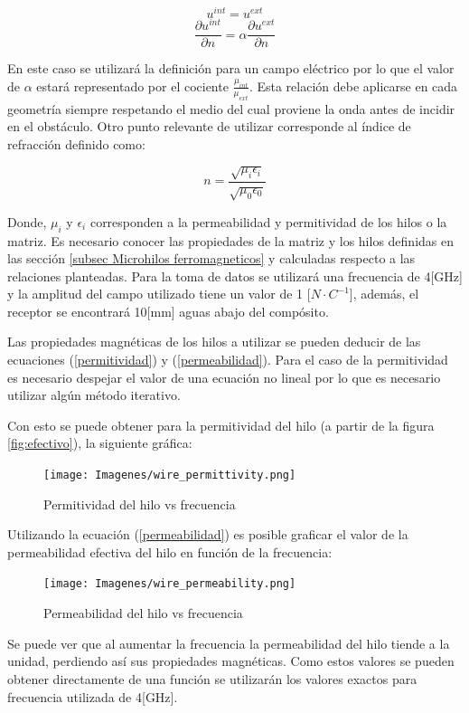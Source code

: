 \documentclass[12pt,letterpaper]{article}
\numberwithin{equation}{section}
\begin{document}
$$u^{int} = u^{ext}$$
$$\frac{\partial u^{int}}{\partial n} =\alpha \frac{\partial u^{ext}}{\partial n}$$
	
En este caso se utilizará la definición para un campo eléctrico por lo que el valor de $\alpha$ estará representado por el cociente $\frac{\mu_{int}}{\mu_{ext}}$. Esta relación debe aplicarse en cada geometría siempre respetando el medio del cual proviene la onda antes de incidir en el obstáculo. Otro punto relevante de utilizar corresponde al índice de refracción definido como:

$$n = \frac{\sqrt{\mu_i\epsilon_i}}{\sqrt{\mu_0\epsilon_0}}$$

Donde, $\mu_i$ y $\epsilon_i$ corresponden a la permeabilidad y permitividad de los hilos o la matriz. Es necesario conocer las propiedades de la matriz y los hilos definidas en las sección \ref{subsec Microhilos ferromagneticos} y calculadas respecto a las relaciones planteadas. Para la toma de datos se utilizará una frecuencia de 4[GHz] y la amplitud del campo utilizado tiene un valor de 1 [$N\cdot C^{-1}$], además, el receptor se encontrará 10[mm] aguas abajo del compósito.

Las propiedades magnéticas de los hilos a utilizar se pueden deducir de las ecuaciones (\ref{permitividad}) y (\ref{permeabilidad}). Para el caso de la permitividad es necesario despejar el valor de una ecuación no lineal por lo que es necesario utilizar algún método iterativo.

Con esto se puede obtener para la permitividad del hilo (a partir de la figura \ref{fig:efectivo}), la siguiente gráfica:

\begin{figure}[H]
	\centering\texttt{[image: Imagenes/wire\_permittivity.png]}\\
	\caption{Permitividad del hilo vs frecuencia}
	\label{fig:wire_permittivity}
\end{figure} 

Utilizando la ecuación (\ref{permeabilidad}) es posible graficar el valor de la permeabilidad efectiva del hilo en función de la frecuencia:

\begin{figure}[H]
	\centering\texttt{[image: Imagenes/wire\_permeability.png]}\\
	\caption{Permeabilidad del hilo vs frecuencia}
	\label{fig:wire_permeability}
\end{figure}

Se puede ver que al aumentar la frecuencia la permeabilidad del hilo tiende a la unidad, perdiendo así sus propiedades magnéticas. Como estos valores se pueden obtener directamente de una función se utilizarán los valores exactos para frecuencia utilizada de 4[GHz].
\end{document}
